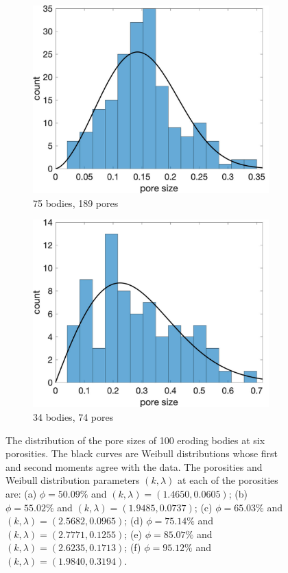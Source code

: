 \documentclass[preprint,10pt]{elsarticle}
\begin{document}
\begin{figure}[H]
\begin{subfigure}[b]{0.3\textwidth}
\includegraphics*[width =\linewidth]{./figs/hist100b_207}
\caption{75 bodies, 189 pores}
\end{subfigure}%
\begin{subfigure}[b]{0.3\textwidth}
\includegraphics*[width =\linewidth]{./figs/hist100b_246}
\caption{34 bodies, 74 pores}
\end{subfigure}
\caption{\label{fig:Eroding100gap_hist} The distribution of the pore
sizes of 100 eroding bodies at six porosities. The black curves are
Weibull distributions whose first and second moments agree with the
data. The porosities and Weibull distribution parameters $(k,\lambda)$
at each of the porosities are: (a) $\phi = 50.09\%$ and
$(k,\lambda)=(1.4650,0.0605)$; (b) $\phi = 55.02\%$ and
$(k,\lambda)=(1.9485,0.0737)$; (c) $\phi = 65.03\%$ and
$(k,\lambda)=(2.5682,0.0965)$; (d) $\phi = 75.14\%$ and
$(k,\lambda)=(2.7771,0.1255)$; (e) $\phi = 85.07\%$ and
$(k,\lambda)=(2.6235,0.1713)$; (f) $\phi = 95.12\%$ and
$(k,\lambda)=(1.9840, 0.3194)$.}
\end{figure}
\end{document}

